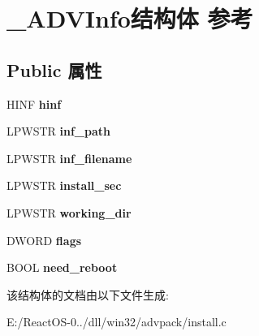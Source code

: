 \hypertarget{struct___a_d_v_info}{}\section{\+\_\+\+A\+D\+V\+Info结构体 参考}
\label{struct___a_d_v_info}
\subsection*{Public 属性}
\begin{DoxyCompactItemize}
\item 
\mbox{\label{struct___a_d_v_info_abca4d7e990cab1539916d0d251b0420a}} 
H\+I\+NF {\bfseries hinf}
\item 
\mbox{\label{struct___a_d_v_info_a38d7e012d028118e35fed64d4285163c}} 
L\+P\+W\+S\+TR {\bfseries inf\+\_\+path}
\item 
\mbox{\label{struct___a_d_v_info_add2e84b25a5baee2dc36e13acb0e35a4}} 
L\+P\+W\+S\+TR {\bfseries inf\+\_\+filename}
\item 
\mbox{\label{struct___a_d_v_info_a19aa069f2d5a11afa88f64d2917db11b}} 
L\+P\+W\+S\+TR {\bfseries install\+\_\+sec}
\item 
\mbox{\label{struct___a_d_v_info_a20535086c0d1e4e373c0fe12582e0889}} 
L\+P\+W\+S\+TR {\bfseries working\+\_\+dir}
\item 
\mbox{\label{struct___a_d_v_info_adf6be2e6fbc6ad9c18e9a9d9ff369a54}} 
D\+W\+O\+RD {\bfseries flags}
\item 
\mbox{\label{struct___a_d_v_info_a821d0f40fbf34f15cf4f50093f31964f}} 
B\+O\+OL {\bfseries need\+\_\+reboot}
\end{DoxyCompactItemize}


该结构体的文档由以下文件生成\+:\begin{DoxyCompactItemize}
\item 
E\+:/\+React\+O\+S-\/0../dll/win32/advpack/install.\+c\end{DoxyCompactItemize}
